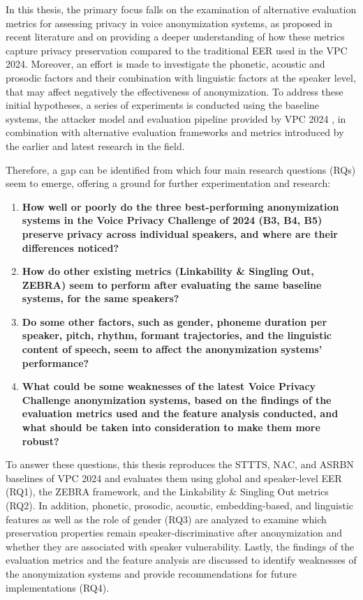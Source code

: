 \documentclass[12pt,leqno,a4paper]{article}
\begin{document}
In this thesis, the primary focus falls on the examination of alternative evaluation metrics for assessing privacy in voice anonymization systems, as proposed in recent literature and on
providing a deeper understanding of how these metrics capture privacy preservation compared to the traditional EER used in the VPC 2024. 
Moreover, an effort is made to investigate the phonetic, acoustic and prosodic factors and their combination with linguistic factors at the speaker level, 
that may affect negatively the effectiveness of anonymization. 
To address these initial hypotheses, a series of experiments is conducted using the baseline systems, the attacker model and evaluation pipeline provided by VPC 2024 \citep{tomashenko2024voiceprivacy2024challengeevaluation}, in combination with alternative evaluation frameworks and metrics introduced by the earlier and latest research in the field.

Therefore, a gap can be identified from which four main research questions (RQs) seem to emerge, offering a ground for further experimentation and research:
\begin{enumerate}[label=\textbf{RQ\arabic*:}, leftmargin=*]
    \item \textbf{How well or poorly do the three best-performing anonymization systems in the Voice Privacy Challenge of 2024 (B3, B4, B5) preserve privacy across individual speakers, and where are their differences noticed?}

    \item \textbf{How do other existing metrics (Linkability \& Singling Out, ZEBRA) seem to perform after evaluating the same baseline systems, for the same speakers?}

    \item \textbf{Do some other factors, such as gender, phoneme duration per speaker, pitch, rhythm, formant trajectories, and the linguistic content of speech, seem to affect the anonymization systems' performance?}

    \item \textbf{What could be some weaknesses of the latest Voice Privacy Challenge anonymization systems, based on the findings of the evaluation metrics used and the feature analysis conducted, and what should be taken into consideration to make them more robust?}
\end{enumerate}

To answer these questions, this thesis reproduces the STTTS, NAC, and ASRBN baselines of VPC 2024 and evaluates them using global and speaker-level EER (RQ1), 
the ZEBRA framework, and the Linkability \& Singling Out metrics (RQ2). In addition, phonetic, prosodic, acoustic, embedding-based, and linguistic features as well as the role of gender (RQ3) are analyzed to 
examine which preservation properties remain speaker-discriminative after anonymization and whether they are associated with speaker vulnerability. Lastly, the findings of the evaluation metrics and the feature 
analysis are discussed to identify weaknesses of the anonymization systems and provide recommendations for future implementations (RQ4).
\end{document}
